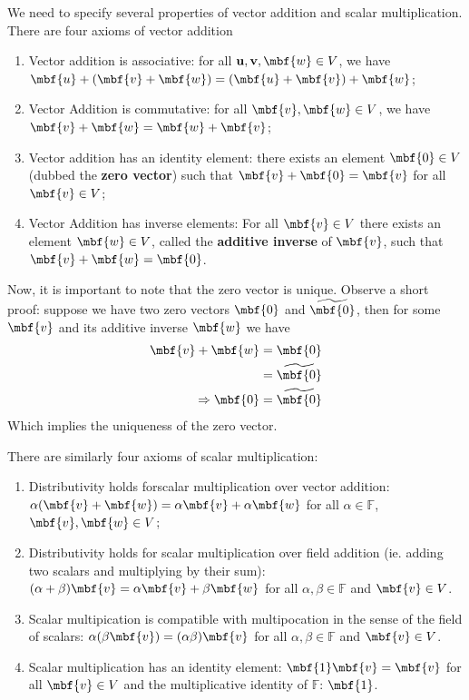 We need to specify several properties of vector addition and
scalar multiplication. There are four axioms of vector
addition
\begin{enumerate}
\item Vector addition is associative: for all
  $\mathbf{u},\mathbf{v},\mbf{w}\in V$, we have
  $\mbf{u}+(\mbf{v}+\mbf{w})=(\mbf{u}+\mbf{v})+\mbf{w}$;
\item Vector Addition is commutative: for all
  $\mbf{v},\mbf{w}\in V$, we have
  $\mbf{v}+\mbf{w}=\mbf{w}+\mbf{v}$;
\item Vector addition has an identity element: there exists
  an element $\mbf{0}\in V$ (dubbed the \textbf{zero
    vector}) such that $\mbf{v}+\mbf{0}=\mbf{v}$ for all
  $\mbf{v}\in V$;
\item Vector Addition has inverse elements: For all
  $\mbf{v}\in V$ there exists an element $\mbf{w}\in V$,
  called the \textbf{additive inverse} of $\mbf{v}$, such
  that $\mbf{v}+\mbf{w}=\mbf{0}$.
\end{enumerate}
Now, it is important to note that the zero vector is
unique. Observe a short proof: suppose we have two zero
vectors $\mbf{0}$ and $\widetilde{\mbf{0}}$, then for some
$\mbf{v}$ and its additive inverse $\mbf{w}$ we have
\begin{subequations}
\begin{align}
\mbf{v}+\mbf{w} &= \mbf{0} \\
&= \widetilde{\mbf{0}} \\
\Rightarrow \mbf{0} &= \widetilde{\mbf{0}}
\end{align}
\end{subequations}
Which implies the uniqueness of the zero vector.

There are similarly four axioms of scalar multiplication:
\begin{enumerate}
\item Distributivity holds forscalar multiplication over
  vector addition:
  $\alpha(\mbf{v}+\mbf{w})=\alpha\mbf{v}+\alpha\mbf{w}$ for
  all $\alpha\in\mathbb{F}$, $\mbf{v},\mbf{w}\in V$;
\item Distributivity holds for scalar multiplication over
  field addition (ie. adding two scalars and multiplying by
  their sum):
  $(\alpha+\beta)\mbf{v}=\alpha\mbf{v}+\beta\mbf{w}$ for all
  $\alpha,\beta\in\mathbb{F}$ and $\mbf{v}\in V$.
\item Scalar multipication is compatible with multipocation
  in the sense of the field of scalars:
  $\alpha(\beta\mbf{v})=(\alpha\beta)\mbf{v}$ for all
  $\alpha,\beta\in\mathbb{F}$ and $\mbf{v}\in V$.
\item Scalar multiplication has an identity element:
  $\mbf{1}\mbf{v}=\mbf{v}$ for all $\mbf{v}\in V$ and the
  multiplicative identity of $\mathbb{F}$: $\mbf{1}$. 
\end{enumerate}

